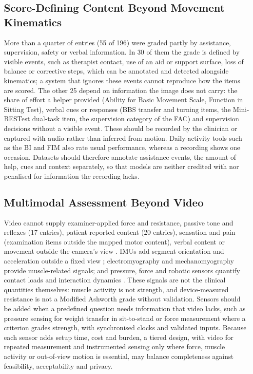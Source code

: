 \documentclass[11pt]{article}
\begin{document}
\subsection{Score-Defining Content Beyond Movement Kinematics}

More than a quarter of entries (55 of 196) were graded partly by assistance, supervision, safety or verbal information. In 30 of them the grade is defined by visible events, such as therapist contact, use of an aid or support surface, loss of balance or corrective steps, which can be annotated and detected alongside kinematics; a system that ignores these events cannot reproduce how the items are scored. The other 25 depend on information the image does not carry: the share of effort a helper provided (Ability for Basic Movement Scale, Function in Sitting Test), verbal cues or responses (BBS transfer and turning items, the Mini-BESTest dual-task item, the supervision category of the FAC) and supervision decisions without a visible event. These should be recorded by the clinician or captured with audio rather than inferred from motion. Daily-activity tools such as the BI and FIM also rate usual performance, whereas a recording shows one occasion. Datasets should therefore annotate assistance events, the amount of help, cues and context separately, so that models are neither credited with nor penalised for information the recording lacks.

\subsection{Multimodal Assessment Beyond Video}

Video cannot supply examiner-applied force and resistance, passive tone and reflexes (17 entries), patient-reported content (20 entries), sensation and pain (examination items outside the mapped motor content), verbal content or movement outside the camera's view \cite{S3John202437682075,S3Stenum202438530801}. IMUs add segment orientation and acceleration outside a fixed view \cite{Yang2013SpatiotemporalGait,Held2018UpperLimbIMU}; electromyography and mechanomyography provide muscle-related signals; and pressure, force and robotic sensors quantify contact loads and interaction dynamics \cite{Li2017IMUEMGMotorEvaluation,Formstone2021IMUMMG,Grimm2021KinematicValidation}. These signals are not the clinical quantities themselves: muscle activity is not strength, and device-measured resistance is not a Modified Ashworth grade without validation. Sensors should be added when a predefined question needs information that video lacks, such as pressure sensing for weight transfer in sit-to-stand or force measurement where a criterion grades strength, with synchronised clocks and validated inputs. Because each sensor adds setup time, cost and burden, a tiered design, with video for repeated measurement and instrumented sensing only where force, muscle activity or out-of-view motion is essential, may balance completeness against feasibility, acceptability and privacy.
\end{document}
